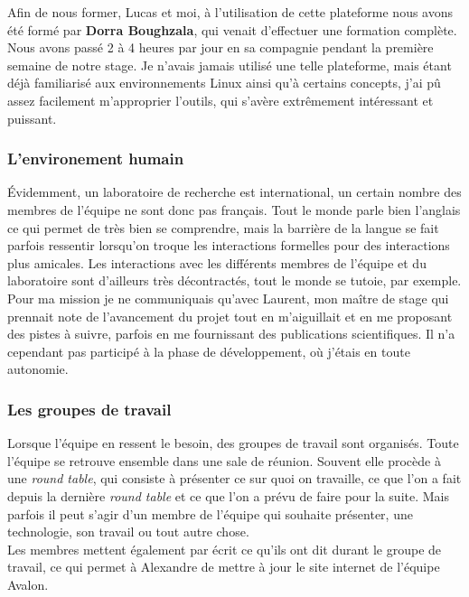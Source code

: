 Afin de nous former, Lucas et moi, à l'utilisation de cette plateforme nous avons été formé par \textbf{Dorra Boughzala}, qui venait d'effectuer une formation complète. Nous avons passé 2 à 4 heures par jour en sa compagnie pendant la première semaine de notre stage. Je n'avais jamais utilisé une telle plateforme, mais étant déjà familiarisé aux environnements Linux ainsi qu'à certains concepts, j'ai pû assez facilement m'approprier l'outils, qui s'avère extrêmement intéressant et puissant.
 
\subsubsection{L'environement humain}
Évidemment, un laboratoire de recherche est international, un certain nombre des membres de l'équipe ne sont donc pas français. Tout le monde parle bien l'anglais ce qui permet de très bien se comprendre, mais la barrière de la langue se fait parfois ressentir lorsqu'on troque les interactions formelles pour des interactions plus amicales. Les interactions avec les différents membres de l'équipe et du laboratoire sont d'ailleurs très décontractés, tout le monde se tutoie, par exemple.\\

Pour ma mission je ne communiquais qu'avec Laurent, mon maître de stage qui prennait note de l'avancement du projet tout en m'aiguillait et en me proposant des pistes à suivre, parfois en me fournissant des publications scientifiques. Il n'a cependant pas participé à la phase de développement, où j'étais en toute autonomie.

\subsubsection{Les groupes de travail}
Lorsque l'équipe en ressent le besoin, des groupes de travail sont organisés. Toute l'équipe se retrouve ensemble dans une sale de réunion. Souvent elle procède à une \emph{round table}, qui consiste à présenter ce sur quoi on travaille, ce que l'on a fait depuis la dernière \emph{round table} et ce que l'on a prévu de faire pour la suite. Mais parfois il peut s'agir d'un membre de l'équipe qui souhaite présenter, une technologie, son travail ou tout autre chose.\\
Les membres mettent également par écrit ce qu'ils ont dit durant le groupe de travail, ce qui permet à Alexandre de mettre à jour le site internet de l'équipe Avalon.